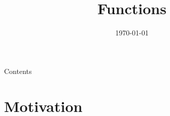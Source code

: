 
\newcommand {\topic}{
    Functions
}

\title{\topic}
\supertitle{\course}
\date{\today}



\maketitle

\begin{frame}{Contents}
    \tableofcontents
\end{frame}

\section{Motivation}
